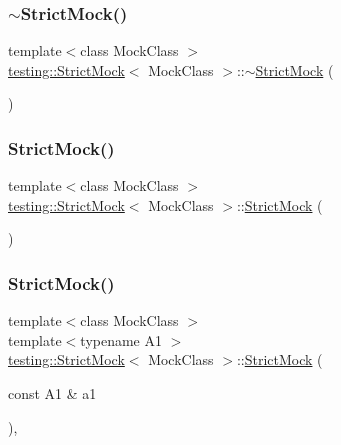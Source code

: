 \subsubsection{\texorpdfstring{$\sim$StrictMock()}{~StrictMock()}\hspace{0.1cm}{\footnotesize\ttfamily [2/3]}}
{\footnotesize\ttfamily template$<$class Mock\+Class $>$ \\
\mbox{\hyperlink{classtesting_1_1_strict_mock}{testing\+::\+Strict\+Mock}}$<$ Mock\+Class $>$\+::$\sim$\mbox{\hyperlink{classtesting_1_1_strict_mock}{Strict\+Mock}} (\begin{DoxyParamCaption}{ }\end{DoxyParamCaption})\hspace{0.3cm}{\ttfamily [inline]}}

\mbox{\label{classtesting_1_1_strict_mock_ad609d745db75306dd3b360b5410923fe}} 
\subsubsection{\texorpdfstring{StrictMock()}{StrictMock()}\hspace{0.1cm}{\footnotesize\ttfamily [7/17]}}
{\footnotesize\ttfamily template$<$class Mock\+Class $>$ \\
\mbox{\hyperlink{classtesting_1_1_strict_mock}{testing\+::\+Strict\+Mock}}$<$ Mock\+Class $>$\+::\mbox{\hyperlink{classtesting_1_1_strict_mock}{Strict\+Mock}} (\begin{DoxyParamCaption}{ }\end{DoxyParamCaption})\hspace{0.3cm}{\ttfamily [inline]}}

\mbox{\label{classtesting_1_1_strict_mock_a42db27ba0af29804db8589676817aff8}} 
\subsubsection{\texorpdfstring{StrictMock()}{StrictMock()}\hspace{0.1cm}{\footnotesize\ttfamily [8/17]}}
{\footnotesize\ttfamily template$<$class Mock\+Class $>$ \\
template$<$typename A1 $>$ \\
\mbox{\hyperlink{classtesting_1_1_strict_mock}{testing\+::\+Strict\+Mock}}$<$ Mock\+Class $>$\+::\mbox{\hyperlink{classtesting_1_1_strict_mock}{Strict\+Mock}} (\begin{DoxyParamCaption}\item[{const A1 \&}]{a1 }\end{DoxyParamCaption})\hspace{0.3cm}{\ttfamily [inline]}, {\ttfamily [explicit]}}

